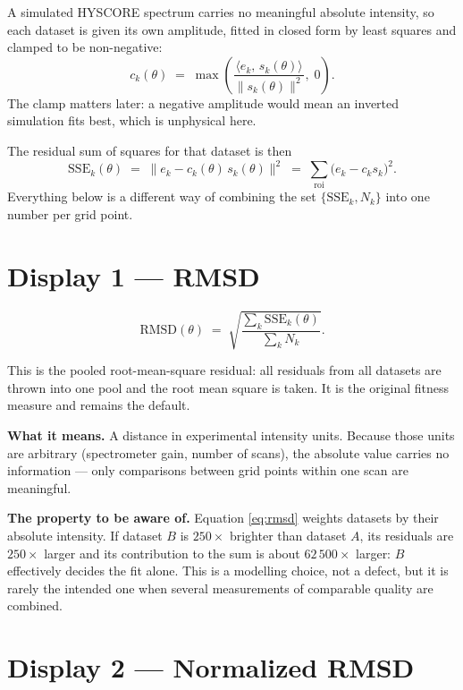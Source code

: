 \documentclass[11pt,a4paper]{article}
\newcommand{\SSE}{\mathrm{SSE}}
\newcommand{\RMSD}{\mathrm{RMSD}}
\begin{document}
A simulated HYSCORE spectrum carries no meaningful absolute intensity, so
each dataset is given its own amplitude, fitted in closed form by least
squares and clamped to be non-negative:
\begin{equation}
c_k(\theta) \;=\; \max\!\left(\frac{\langle e_k,\,s_k(\theta)\rangle}
{\lVert s_k(\theta)\rVert^{2}},\; 0\right).
\label{eq:amp}
\end{equation}
The clamp matters later: a negative amplitude would mean an inverted
simulation fits best, which is unphysical here.

The residual sum of squares for that dataset is then
\begin{equation}
\SSE_k(\theta) \;=\; \bigl\lVert e_k - c_k(\theta)\,s_k(\theta)\bigr\rVert^{2}
\;=\;\sum_{\text{roi}} \bigl(e_k - c_k s_k\bigr)^2 .
\label{eq:sse}
\end{equation}
Everything below is a different way of combining the set
$\{\SSE_k, N_k\}$ into one number per grid point.

\section{Display 1 --- RMSD}

\begin{equation}
\RMSD(\theta) \;=\; \sqrt{\frac{\sum_k \SSE_k(\theta)}{\sum_k N_k}} .
\label{eq:rmsd}
\end{equation}

This is the pooled root-mean-square residual: all residuals from all
datasets are thrown into one pool and the root mean square is taken. It is
the original fitness measure and remains the default.

\textbf{What it means.} A distance in experimental intensity units.
Because those units are arbitrary (spectrometer gain, number of scans), the
absolute value carries no information --- only comparisons between grid
points within one scan are meaningful.

\textbf{The property to be aware of.} Equation \eqref{eq:rmsd} weights
datasets by their absolute intensity. If dataset $B$ is $250\times$ brighter
than dataset $A$, its residuals are $250\times$ larger and its contribution
to the sum is about $62\,500\times$ larger: $B$ effectively decides the fit
alone. This is a modelling choice, not a defect, but it is rarely the
intended one when several measurements of comparable quality are combined.

\section{Display 2 --- Normalized RMSD}
\label{sec:norm}
\end{document}
